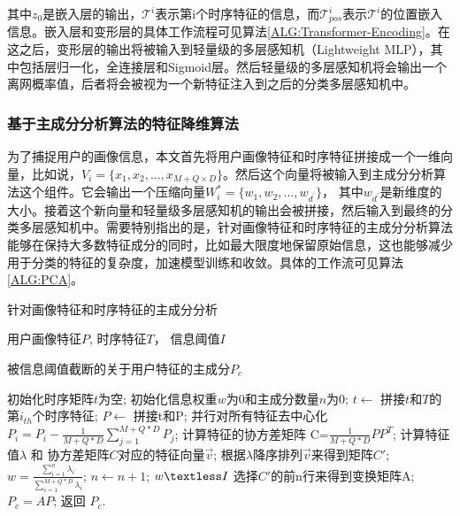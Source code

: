 其中$z_{0}$是嵌入层的输出，$\mathcal{T}^{i}$表示第i个时序特征的信息，而$\mathcal{T}^{i}_{pos}$表示$\mathcal{T}^{i}$的位置嵌入信息。嵌入层和变形层的具体工作流程可见算法\ref{ALG:Transformer-Encoding}。在这之后，变形层的输出将被输入到轻量级的多层感知机（Lightweight MLP），其中包括层归一化，全连接层和Sigmoid层。然后轻量级的多层感知机将会输出一个离网概率值，后者将会被视为一个新特征注入到之后的分类多层感知机中。

\subsubsection{基于主成分分析算法的特征降维算法}
为了捕捉用户的画像信息，本文首先将用户画像特征和时序特征拼接成一个一维向量，比如说，$V_{i} = \{x_{1}, x_{2}, ..., x_{M+Q \times D}  \}$。然后这个向量将被输入到主成分分析算法这个组件。它会输出一个压缩向量$ W_{i}^{*} = \{ w_{1}, w_{2}, ..., w_{d^{'}} \} $， 其中$w_{d^{'}}$是新维度的大小。接着这个新向量和轻量级多层感知机的输出会被拼接，然后输入到最终的分类多层感知机中。需要特别指出的是，针对画像特征和时序特征的主成分分析算法能够在保持大多数特征成分的同时，比如最大限度地保留原始信息，这也能够减少用于分类的特征的复杂度，加速模型训练和收敛。具体的工作流可见算法\ref{ALG:PCA}。
\begin{algorithm}
	\caption{针对画像特征和时序特征的主成分分析}
	\label{ALG:PCA}
	\renewcommand{\algorithmicrequire}{\textbf{Input:}}
	\renewcommand{\algorithmicensure}{\textbf{Output:}}
	
	\begin{algorithmic}[1]
		\REQUIRE 用户画像特征$P$, 时序特征$T$， 信息阈值$I$
		
		\ENSURE 被信息阈值截断的关于用户特征的主成分$P_{c}$
		
		\STATE 初始化时序矩阵$t$为空;
		\STATE 初始化信息权重$w$为0和主成分数量$n$为0;
		\STATE $t \gets$ 拼接$t$和$T$的第$i_{th}$个时序特征;
		\ENDFOR
		\STATE $P \gets$ 拼接t和P;
		\STATE 并行对所有特征去中心化 $P_i =P_i - \frac{1}{M+Q*D} \sum_{j=1}^{M+Q*D} P_j$;
		\STATE 计算特征的协方差矩阵 C=$\frac{1}{M+Q*D}PP^T$;
		\STATE 计算特征值$\lambda$ 和 协方差矩阵$C$对应的特征向量$\vec v$;
		\STATE 根据$\lambda$降序排列$\vec v$来得到矩阵$C'$;
		\REPEAT
		\STATE $w=\frac{\sum_{i=1}^{n}\lambda_i}{\sum_{i=1}^{M+Q*D}\lambda_i}$;
		\STATE $n\gets n+1$;
		\UNTIL $w \textless I$
		\STATE 选择$C'$的前n行来得到变换矩阵A;
		\STATE $P_c = AP$;
		\STATE 返回 $P_c$.
	\end{algorithmic}
\end{algorithm}

